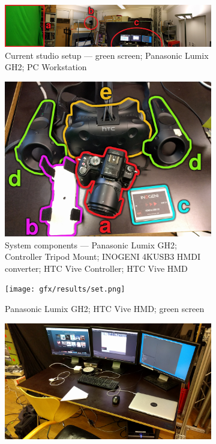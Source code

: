 \begin{figure}[htbp]
	\caption{System Setup}
	\label{fig:intro:results}
	\centering
	\begin{subfigure}[t]{\textwidth}
		\centering
		\includegraphics[width=\textwidth]{gfx/results/pano.png}
		\caption{Current studio setup ---  green screen; 
		 Panasonic Lumix GH2;  PC Workstation}
	\end{subfigure}
	\begin{subfigure}[t]{.49\textwidth}
		\centering
		\includegraphics[width=\textwidth]{gfx/results/camera.png}
		\caption{System components ---  Panasonic Lumix GH2; 
		 Controller Tripod Mount;  INOGENI 4KUSB3 HMDI 
		converter;  HTC Vive Controller;  HTC Vive HMD}
	\end{subfigure}
	\hfill
	\begin{subfigure}[t]{.49\textwidth}
		\centering
		\texttt{[image: gfx/results/set.png]}
		\caption{ Panasonic Lumix GH2;  HTC Vive HMD; 
		 green screen}
	\end{subfigure}
	\begin{subfigure}[t]{.49\textwidth}
		\centering
		\includegraphics[width=\textwidth]{gfx/results/pc.png}

\end{subfigure}
\end{figure}
